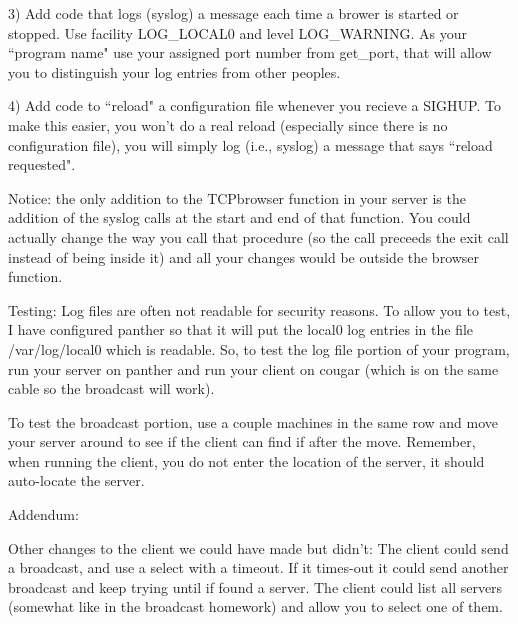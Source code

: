 3) Add code that logs ({\ltt{}syslog}) a message each time a brower
is started or stopped. Use facility {\ltt{}LOG_LOCAL0}
and level {\ltt{}LOG_WARNING}.
As your ``program name" use your assigned port number from {\ltt{}get_port},
that will allow you to distinguish your log entries from other peoples.

4) Add code to ``reload" a configuration file whenever you
recieve a {\ltt{}SIGHUP}.
To make this easier, you won't do a real reload (especially since
there is no configuration file), you will simply
log (i.e., {\ltt{}syslog}) a message that says ``reload requested".

Notice: the only addition to the {\ltt{}TCPbrowser} function in your server
is the addition of the {\ltt{}syslog} calls at the start and end of that
function.
You could actually change the way you call that procedure (so the call
preceeds the exit call instead of being inside it) and all your changes
would be outside the browser function.

Testing:
Log files are often not readable for security reasons.
To allow you to test,
I have configured {\ltt{}panther} so that it will put the {\ltt{}local0} log entries
in the file {\ltt{}/var/log/local0} which is readable.
So, to test the log file portion of your program, run your server on {\ltt{}panther} and run
your client on {\ltt{}cougar} (which is on the same cable so the
broadcast will work).

To test the broadcast portion, use a couple machines in the same row
and move your server around to see if the client can find if after
the move. Remember, when running the client, you do not enter the location
of the server, it should auto-locate the server.

Addendum:

Other changes to the client we could have made but didn't:
The client could send a broadcast, and use a select with a timeout.
If it times-out it could send another broadcast and keep trying until
if found a server.
The client could list all servers (somewhat like in the broadcast homework)
and allow you to select one of them.

\bye
